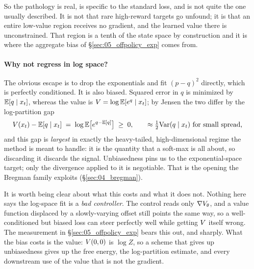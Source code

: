 So the pathology is real, is specific to the standard loss, and is not quite
the one usually described. It is not that rare high-reward targets go unfound;
it is that an entire low-value region receives no gradient, and the learned
value there is unconstrained. That region is a tenth of the state space by
construction and it is where the aggregate bias of \S\ref{sec:05_offpolicy_exp}
comes from.

\paragraph{Why not regress in log space?}
The obvious escape is to drop the exponentials and fit $(p-q)^2$ directly,
which is perfectly conditioned. It is also biased. Squared error in $q$ is
minimized by $\mathbb{E}[q\mid x_t]$, whereas the value is
$V=\log\mathbb{E}[e^{q}\mid x_t]$; by Jensen the two differ by the log-partition gap
\begin{equation}
  V(x_t)-\mathbb{E}[q\mid x_t]\;=\;\log\mathbb{E}\big[e^{q-\mathbb{E}[q]}\big]\;\ge\;0,
  \qquad \approx \tfrac12\mathrm{Var}(q\mid x_t)\ \text{for small spread,}
  \label{eq:jensen-gap}
\end{equation}
and this gap is \emph{largest} in exactly the heavy-tailed, high-dimensional
regime the method is meant to handle: it is the quantity that a soft-max is all
about, so discarding it discards the signal. Unbiasedness pins us to the
exponential-space target; only the divergence applied to it is negotiable. That
is the opening the Bregman family exploits (\S\ref{sec:04_bregman}).

It is worth being clear about what this costs and what it does not. Nothing
here says the log-space fit is a \emph{bad controller}. The control reads only
$\nabla V_\theta$, and a value function displaced by a slowly-varying offset
still points the same way, so a well-conditioned but biased loss can steer
perfectly well while getting $V$ itself wrong. The measurement in
\S\ref{sec:05_offpolicy_exp} bears this out, and sharply. What the bias costs
is the value: $V(0,0)$ is $\log Z$, so a scheme that gives up unbiasedness
gives up the free energy, the log-partition estimate, and every downstream use
of the value that is not the gradient.

